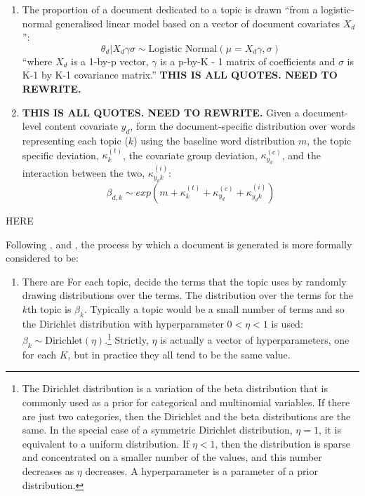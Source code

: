 \documentclass[12pt,]{article}
\providecommand{\tightlist}{%
\setlength{\itemsep}{0pt}\setlength{\parskip}{0pt}}
\theoremstyle{definition}
\theoremstyle{definition}
\theoremstyle{definition}
\theoremstyle{remark}
\begin{document}
\begin{enumerate}
\def\labelenumi{\arabic{enumi}.}
\tightlist
\item
  The proportion of a document dedicated to a topic is drawn ``from a
  logistic-normal generalised linear model based on a vector of document
  covariates \(X_d\)'':
  \[\theta_d|X_d\gamma\sigma \sim \mbox{Logistic Normal}(\mu = X_d\gamma, \sigma)\]
  ``where \(X_d\) is a 1-by-p vector, \(\gamma\) is a p-by-K - 1 matrix
  of coefficients and \(\sigma\) is K-1 by K-1 covariance matrix.''
  \textbf{THIS IS ALL QUOTES. NEED TO REWRITE.}
\item
  \textbf{THIS IS ALL QUOTES. NEED TO REWRITE.} Given a document-level
  content covariate \(y_d\), form the document-specific distribution
  over words representing each topic (\(k\)) using the baseline word
  distribution \(m\), the topic specific deviation, \(\kappa_k^{(t)}\),
  the covariate group deviation, \(\kappa_{y_d}^{(c)}\), and the
  interaction between the two, \(\kappa_{y_{d}k}^{(i)}\):
  \[\beta_{d,k}\sim exp(m+\kappa^{(t)}_{k} + \kappa_{y_d}^{(c)} + \kappa_{y_{d}k}^{(i)}) \]
\end{enumerate}

HERE

Following \citet{BleiLafferty2009}, \citet{blei2012} and
\citet{GriffithsSteyvers2004}, the process by which a document is
generated is more formally considered to be:

\begin{enumerate}
\def\labelenumi{\arabic{enumi}.}
\tightlist
\item
  There are For each topic, decide the terms that the topic uses by
  randomly drawing distributions over the terms. The distribution over
  the terms for the \(k\)th topic is \(\beta_k\). Typically a topic
  would be a small number of terms and so the Dirichlet distribution
  with hyperparameter \(0<\eta<1\) is used:
  \(\beta_k \sim \mbox{Dirichlet}(\eta)\).\footnote{The Dirichlet
    distribution is a variation of the beta distribution that is
    commonly used as a prior for categorical and multinomial variables.
    If there are just two categories, then the Dirichlet and the beta
    distributions are the same. In the special case of a symmetric
    Dirichlet distribution, \(\eta=1\), it is equivalent to a uniform
    distribution. If \(\eta<1\), then the distribution is sparse and
    concentrated on a smaller number of the values, and this number
    decreases as \(\eta\) decreases. A hyperparameter is a parameter of
    a prior distribution.} Strictly, \(\eta\) is actually a vector of
  hyperparameters, one for each \(K\), but in practice they all tend to
  be the same value.
\end{enumerate}
\end{document}
